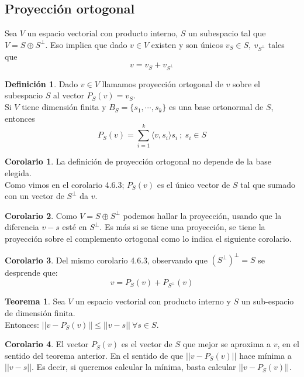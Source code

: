 \documentclass[10pt]{article}
\theoremstyle{definition}
\newtheorem{definition}{Definición}[section]
\newtheorem{theorem}{Teorema}[section]
\newtheorem{corollary}{Corolario}[theorem]
\begin{document}
\subsection{Proyección ortogonal}
Sea $V$ un espacio vectorial con producto interno, $S$ un subespacio tal que $V=S\oplus S^\bot$. Eso implica que dado $v\in V$ existen y son únicos $v_S\in S,\ v_{S^\bot}$ tales que $$v=v_S+v_{S^\bot}$$
\begin{definition}
    Dado $v\in V$ llamamos proyección ortogonal de $v$ sobre el subespacio $S$ al vector $P_S(v)=v_S$.
    \\Si $V$ tiene dimensión finita y $B_S=\{s_1,\cdots,s_k\}$ es una base ortonormal de $S$, entonces $$P_S(v)=\sum_{i=1}^{k} \langle v,s_i\rangle s_i\ ;\ s_i\in S$$
\end{definition}
\begin{corollary}
    La definición de proyección ortogonal no depende de la base elegida.\\
    Como vimos en el corolario 4.6.3; $P_S(v)$ es el único vector de $S$ tal que sumado con un vector de $S^\bot$ da $v$.
\end{corollary}
\begin{corollary}
    Como $V=S\oplus S^\bot$ podemos hallar la proyección, usando que la diferencia $v-s$ esté en $S^\bot$. Es más si se tiene una proyección, se tiene la proyección sobre el complemento ortogonal como lo indica el siguiente corolario.
\end{corollary}
\begin{corollary}
    Del mismo corolario 4.6.3, observando que $(S^\bot)^\bot=S$ se desprende que: $$v=P_S(v)+P_{S^\bot}(v)$$
\end{corollary}
\begin{theorem}
    Sea $V$ un espacio vectorial con producto interno y $S$ un sub-espacio de dimensión finita.\\
    Entonces: $||v-P_S(v)||\le ||v-s||\ \forall s\in S$.
\end{theorem}
\begin{corollary}
    El vector $P_S(v)$ es el vector de $S$ que mejor se aproxima a $v$, en el sentido del teorema anterior. En el sentido de que $||v-P_S(v)||$ hace mínima a $||v-s||$. Es decir, si queremos calcular la mínima, basta calcular $||v-P_S(v)||$.
\end{corollary}
\end{document}
